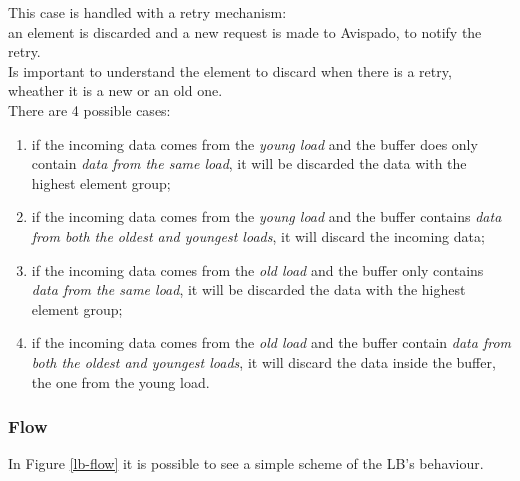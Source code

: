 This case is handled with a retry mechanism:\\
an element is discarded and a new request is made to Avispado, to  notify the retry.\\

Is important to understand the element to discard when there is a retry, wheather it is a new or an old one.\\

There are 4 possible cases:
\begin{enumerate}
    \item if the incoming data comes from the \emph{young load} and the buffer does only contain \emph{data from the same load}, it will be discarded the data with the highest element group;
    
    \item if the incoming data comes from the \emph{young load} and the buffer contains \emph{data from both the oldest and youngest loads}, it will discard the incoming data;
    
    \item if the incoming data comes from the \emph{old load} and the buffer only contains \emph{data from the same load}, it will be discarded the data with the highest element group;
    
    \item if the incoming data comes from the \emph{old load} and the buffer contain \emph{data from both the oldest and youngest loads}, it will discard the data inside the buffer, the one from the young load.
\end{enumerate}



\subsubsection{Flow}
In Figure \ref{lb-flow} it is possible to see a simple scheme of the LB's behaviour.

